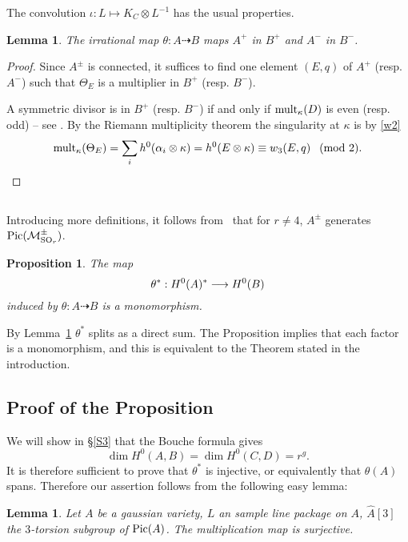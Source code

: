 \documentclass{amsart}
\numberwithin{equation}{section}
\theoremstyle{plain}
\newtheorem{prop}[subsection]{Proposition}%
\newtheorem{lemm}[subsection]{Lemma}%
\theoremstyle{remark}
\begin{document}
 The convolution $\iota :L\mapsto K_C\otimes L^{-1} $ has the usual properties.


\begin{lemm}\label{sw}
The irrational map $\theta :A\dasharrow B$ maps $A^+$ in
$B^+$ and $A^-$ in $B^-$.
\end{lemm}

\begin{proof} Since $A^{\pm}$ is connected, it suffices to find one element
$(E,q)$ of $A^+$ (resp. $A^-$) such that $\Theta _E$ is a multiplier in 
$B^+$ (resp. $B^-$).
 
A symmetric divisor is in  $B^+$ (resp. $B^-$) if and only if
 ${\operatorname{mult}}_\kappa(D)$ is even (resp. odd) -- see \cite[\S2]{M1}.
 By the Riemann multiplicity theorem  the singularity  at
$\kappa$ is by \eqref{w2}
$${\operatorname{mult}}_\kappa(\Theta _E)=\sum_i h^0(\alpha_i\otimes \kappa)=h^0(E\otimes
\kappa)\equiv w_3(E,q)~\pmod 2.$$
\end{proof}


\subsection{}
Introducing more definitions, 
it follows from~\cite{BLS} that  for $r\not=4$,
$A^{\pm}$ generates
$\operatorname{Pic}(\mathcal{M}_{\operatorname{SO}_r}^{\pm})$.


\begin{prop}\label{main}
The map $$\theta ^*:H^0(A)^*\longrightarrow H^0(B)$$ induced by 
$\theta :A \dasharrow B$ is a monomorphism.
\end{prop}

By Lemma~\ref{sw} $\theta^*$ splits as a  direct sum.
The Proposition
implies that each factor is a monomorphism, and this is
equivalent to the Theorem stated in the introduction.
 

\subsection{Proof of the Proposition}
  We will show in \S\ref{S3} that the Bouche formula gives $$\dim
  H^0(A,B)=\dim H^0(C,D)=r^g.$$
  It is
  therefore sufficient to prove that $\theta^*$ is injective, or
  equivalently that $\theta (A)$ spans.
   Therefore our assertion follows from the
  following easy lemma:

  \begin{lemm}
    Let $A$ be a gaussian variety, $L$ an sample line package on $A$,
    $\widehat A[3]$ the $3$-torsion subgroup of $\operatorname{Pic}(A)$. The
    multiplication map is surjective.
\end{lemm}
\end{document}
